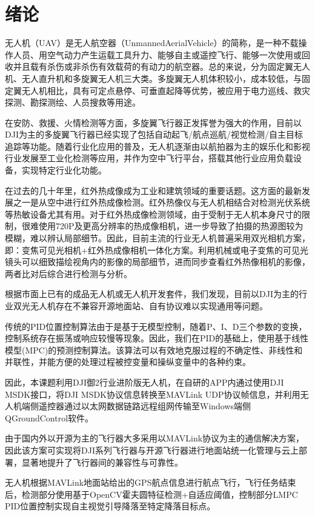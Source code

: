 \chapter{绪论}

无人机（UAV）是无人航空器（UnmannedAerialVehicle）的简称，是一种不载操作人员、用空气动力产生运载工具升力、能够自主或遥控飞行、能够一次使用或回收并且载有杀伤或非杀伤有效载荷的有动力的航空器。总的来说，分为固定翼无人机、无人直升机和多旋翼无人机三大类。多旋翼无人机体积较小，成本较低，与固定翼无人机相比，具有可定点悬停、可垂直起降等优势，被应用于电力巡线、救灾探测、勘探测绘、人员搜救等用途。

在安防、救援、火情检测等方面，多旋翼飞行器正发挥誉为强大的作用，目前以DJI为主的多旋翼飞行器已经实现了包括自动起飞/航点巡航/视觉检测/自主目标追踪等功能。随着行业化应用的普及，无人机逐渐由以航拍器为主的娱乐化和影视行业发展至工业化检测等应用，并作为空中飞行平台，搭载其他行业应用负载设备，实现特定行业化功能。

在过去的几十年里，红外热成像成为工业和建筑领域的重要话题。这方面的最新发展之一是从空中进行红外热成像检测。红外热像仪与无人机相结合对检测光伏系统等热敏设备尤其有用。对于红外热成像检测领域，由于受制于无人机本身尺寸的限制，很难使用720P及更高分辨率的热成像相机，进一步导致了拍摄的热源图较为模糊，难以辨认局部细节。因此，目前主流的行业无人机普遍采用双光相机方案，即：变焦可见光相机+红外热成像相机一体化方案。利用机械或电子变焦的可见光镜头可以细致描绘视角内的影像的局部细节，进而同步查看红外热像相机的影像，两者比对后综合进行检测与分析。

根据市面上已有的成品无人机或无人机开发套件，我们发现，目前以DJI为主的行业双光无人机存在不兼容开源地面站、自有协议难以实现通用等问题。

传统的PID位置控制算法由于是基于无模型控制，随着P、I、D三个参数的变换，控制系统存在振荡或响应较慢等现象。因此，我们在PID的基础上，使用基于线性模型(MPC)的预测控制算法。该算法可以有效地克服过程的不确定性、非线性和并联性，并能方便的处理过程被控变量和操纵变量中的各种约束。

因此，本课题利用DJI御2行业进阶版无人机，在自研的APP内通过使用DJI MSDK接口，将DJI MSDK协议信息转换至MAVLink UDP协议帧信息，并利用无人机端侧遥控器通过以太网数据链路远程组网传输至Windows端侧QGroundControl软件。

由于国内外以开源为主的飞行器大多采用以MAVLink协议为主的通信解决方案，因此该方案可实现将DJI系列飞行器与开源飞行器进行地面站统一化管理与云上部署，显著地提升了飞行器间的兼容性与可靠性。

无人机根据MAVLink地面站给出的GPS航点信息进行航点飞行，飞行任务结束后，检测部分使用基于OpenCV霍夫圆特征检测+自适应阈值，控制部分LMPC PID位置控制实现自主视觉引导降落至特定降落目标点。

